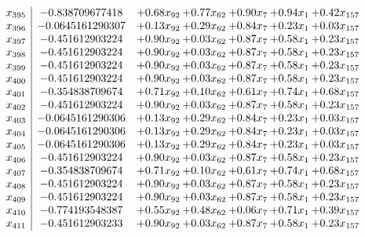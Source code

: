 \documentclass[8pt]{article}
\begin{document}
\[\begin{array}{c| c c@{\hskip 2pt} c@{\hskip 2pt} c@{\hskip 2pt} c@{\hskip 2pt} c@{\hskip 2pt} }
 x_{395}   &  -0.838709677418 & +  0.68 x_{92} & +  0.77 x_{62} & +  0.90 x_{7} & +  0.94 x_{1} & +  0.42 x_{157}\\
 x_{396}   &  -0.0645161290307 & +  0.13 x_{92} & +  0.29 x_{62} & +  0.84 x_{7} & +  0.23 x_{1} & +  0.03 x_{157}\\
 x_{397}   &  -0.451612903224 & +  0.90 x_{92} & +  0.03 x_{62} & +  0.87 x_{7} & +  0.58 x_{1} & +  0.23 x_{157}\\
 x_{398}   &  -0.451612903224 & +  0.90 x_{92} & +  0.03 x_{62} & +  0.87 x_{7} & +  0.58 x_{1} & +  0.23 x_{157}\\
 x_{399}   &  -0.451612903224 & +  0.90 x_{92} & +  0.03 x_{62} & +  0.87 x_{7} & +  0.58 x_{1} & +  0.23 x_{157}\\
 x_{400}   &  -0.451612903224 & +  0.90 x_{92} & +  0.03 x_{62} & +  0.87 x_{7} & +  0.58 x_{1} & +  0.23 x_{157}\\
 x_{401}   &  -0.354838709674 & +  0.71 x_{92} & +  0.10 x_{62} & +  0.61 x_{7} & +  0.74 x_{1} & +  0.68 x_{157}\\
 x_{402}   &  -0.451612903224 & +  0.90 x_{92} & +  0.03 x_{62} & +  0.87 x_{7} & +  0.58 x_{1} & +  0.23 x_{157}\\
 x_{403}   &  -0.0645161290306 & +  0.13 x_{92} & +  0.29 x_{62} & +  0.84 x_{7} & +  0.23 x_{1} & +  0.03 x_{157}\\
 x_{404}   &  -0.0645161290306 & +  0.13 x_{92} & +  0.29 x_{62} & +  0.84 x_{7} & +  0.23 x_{1} & +  0.03 x_{157}\\
 x_{405}   &  -0.0645161290306 & +  0.13 x_{92} & +  0.29 x_{62} & +  0.84 x_{7} & +  0.23 x_{1} & +  0.03 x_{157}\\
 x_{406}   &  -0.451612903224 & +  0.90 x_{92} & +  0.03 x_{62} & +  0.87 x_{7} & +  0.58 x_{1} & +  0.23 x_{157}\\
 x_{407}   &  -0.354838709674 & +  0.71 x_{92} & +  0.10 x_{62} & +  0.61 x_{7} & +  0.74 x_{1} & +  0.68 x_{157}\\
 x_{408}   &  -0.451612903224 & +  0.90 x_{92} & +  0.03 x_{62} & +  0.87 x_{7} & +  0.58 x_{1} & +  0.23 x_{157}\\
 x_{409}   &  -0.451612903224 & +  0.90 x_{92} & +  0.03 x_{62} & +  0.87 x_{7} & +  0.58 x_{1} & +  0.23 x_{157}\\
 x_{410}   &  -0.774193548387 & +  0.55 x_{92} & +  0.48 x_{62} & +  0.06 x_{7} & +  0.71 x_{1} & +  0.39 x_{157}\\
 x_{411}   &  -0.451612903233 & +  0.90 x_{92} & +  0.03 x_{62} & +  0.87 x_{7} & +  0.58 x_{1} & +  0.23 x_{157}\\

\end{array}\]
\end{document}
